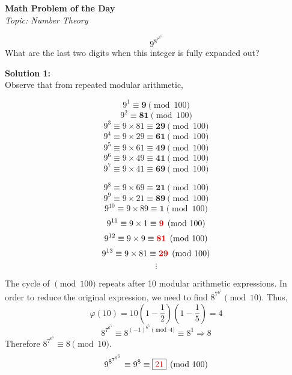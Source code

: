 \documentclass[14pt]{extreport}
\begin{document}
	\raggedcolumns
	\setlength{\columnsep}{10pt}
	\renewcommand{\arraystretch}{1.5}
	\singlespacing
	
	\begin{center}
		{\large  \textbf{Math Problem of the Day}} \\
		{\emph{Topic: Number Theory}} 
	\end{center}
	{ \LARGE
	\[ 9^{8^{7^{6^5}}}  \] }
	\noindent
	What are the last two digits when this integer is fully expanded out?
	
	\bigskip
	\noindent
	\textbf{Solution 1:} \\
	Observe that from repeated modular arithmetic,
	\begin{multicols}{2}
			\[ 9^1  \equiv \textbf{9} \pmod{100} \]
			\[ 9^2  \equiv \textbf{81} \pmod{100} \]
			\[	9^3  \equiv 9 \times 81 \equiv \textbf{29} \pmod{100} \]
			\[	9^4  \equiv 9 \times 29 \equiv \textbf{61} \pmod{100} \]
			\[	9^5  \equiv 9 \times 61 \equiv \textbf{49} \pmod{100} \]
			\[	9^6  \equiv 9 \times 49 \equiv \textbf{41} \pmod{100} \]
			\[	9^7  \equiv 9 \times 41 \equiv \textbf{69} \pmod{100} \]
			
	\columnbreak
			\[ 9^8  \equiv 9 \times 69 \equiv \textbf{21} \pmod{100} \]
			\[ 9^9  \equiv 9 \times 21 \equiv \textbf{89} \pmod{100} \] 
			\[ 9^{10}  \equiv 9 \times 89 \equiv \textbf{1} \pmod{100} \]
			\[ 9^{11}  \equiv 9 \times 1 \equiv \textbf{\textcolor{red}{9}} \pmod{100} \] 
			\[ 9^{12}  \equiv 9 \times 9 \equiv \textbf{\textcolor{red}{81}} \pmod{100} \]
			\[ 9^{13}  \equiv 9 \times 81 \equiv \textbf{\textcolor{red}{29}} \pmod{100} \]
			\[ \vdots \]
	\end{multicols}
	\noindent
	The cycle of $\pmod{100}$ repeats after 10 modular arithmetic expressions. In order to reduce the original expression, we need to find \( \displaystyle 8^{7^{6^5} }  \pmod{10} \). Thus,
	\[ \varphi(10) = 10 \left( 1 - \frac{1}{2} \right) \left(  1 - \frac{1}{5} \right) = 4 \]
	\large
	\[ 8^{{7^{6^5}}} \equiv 8^{{{(-1)}^{6^5} \pmod{4}}} \equiv 8^1 \Rightarrow 8 \]
	Therefore $8^{{7^{6^5}}} \equiv 8 \pmod{10}$.
	\[ 9^{8^{7^{6^5}}} \equiv 9^8 \equiv \fbox{\textcolor{red}{21}} \pmod{100}  \]
\end{document}
